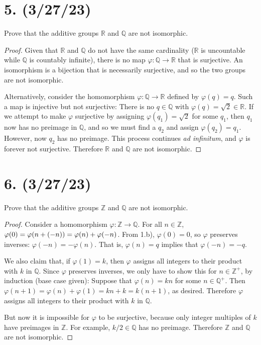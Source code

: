 \documentclass{article}
\begin{document}
\section*{5. (3/27/23)}

Prove that the additive groups $\mathbb{R}$ and $\mathbb{Q}$ are not isomorphic.

\begin{proof}
    Given that $\mathbb{R}$ and $\mathbb{Q}$ do not have the same cardinality ($\mathbb{R}$ is uncountable while $\mathbb{Q}$ is countably infinite), there is no map $\varphi: \mathbb{Q} \rightarrow \mathbb{R}$ that is surjective. An isomorphism is a bijection that is necessarily surjective, and so the two groups are not isomorphic.

    Alternatively, consider the homomorphism $\varphi: \mathbb{Q} \rightarrow \mathbb{R}$ defined by $\varphi(q) = q$. Such a map is injective but not surjective: There is no $q \in \mathbb{Q}$ with $\varphi(q) = \sqrt{2} \in \mathbb{R}$. If we attempt to make $\varphi$ surjective by assigning $\varphi(q_1) = \sqrt{2}$ for some $q_1$, then $q_1$ now has no preimage in $\mathbb{Q}$, and so we must find a $q_2$ and assign $\varphi(q_2) = q_1$. However, now $q_2$ has no preimage. This process continues \emph{ad infinitum}, and $\varphi$ is forever not surjective. Therefore $\mathbb{R}$ and $\mathbb{Q}$ are not isomorphic.
\end{proof}

\section*{6. (3/27/23)}

Prove that the additive groups $\mathbb{Z}$ and $\mathbb{Q}$ are not isomorphic.

\begin{proof}
    Consider a homomorphism $\varphi: \mathbb{Z} \rightarrow \mathbb{Q}$. For all $n \in \mathbb{Z}$, $\varphi(0) = \newline
    \varphi(n + (-n)) = \varphi(n) + \varphi(-n)$. From 1.b), $\varphi(0) = 0$, so $\varphi$ preserves inverses: $\varphi(-n) = -\varphi(n)$. That is, $\varphi(n) = q$ implies that $\varphi(-n) = -q$.

    We also claim that, if $\varphi(1) = k$, then $\varphi$ assigns all integers to their product with $k$ in $\mathbb{Q}$. Since $\varphi$ preserves inverses, we only have to show this for $n \in \mathbb{Z}^+$, by induction (base case given): Suppose that $\varphi(n) = kn$ for some $n \in \mathbb{Q}^+$. Then $\varphi(n + 1) = \varphi(n) + \varphi(1) = kn + k = k(n + 1)$, as desired. Therefore $\varphi$ assigns all integers to their product with $k$ in $\mathbb{Q}$.

    But now it is impossible for $\varphi$ to be surjective, because only integer multiples of $k$ have preimages in $\mathbb{Z}$. For example, $k / 2 \in \mathbb{Q}$ has no preimage. Therefore $\mathbb{Z}$ and $\mathbb{Q}$ are not isomorphic.
\end{proof}
\end{document}
